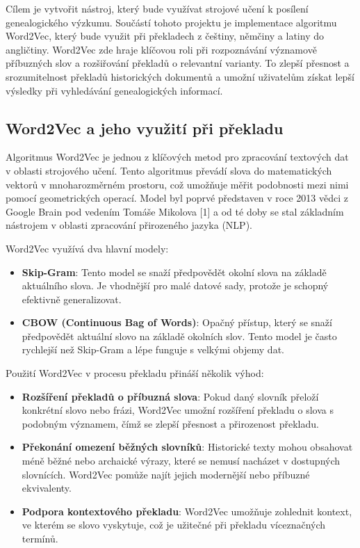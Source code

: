 \documentclass[czech, ba, kiv, he]{fasthesis}
\begin{document}
Cílem je vytvořit nástroj, který bude využívat strojové učení k posílení genealogického výzkumu. Součástí tohoto projektu je implementace algoritmu Word2Vec, který bude využit při překladech z češtiny, němčiny a latiny do angličtiny. Word2Vec zde hraje klíčovou roli při rozpoznávání významově příbuzných slov a rozšiřování překladů o relevantní varianty. To zlepší přesnost a srozumitelnost překladů historických dokumentů a umožní uživatelům získat lepší výsledky při vyhledávání genealogických informací.  

\subsection{Word2Vec a jeho využití při překladu}  

Algoritmus Word2Vec je jednou z klíčových metod pro zpracování textových dat v oblasti strojového učení. Tento algoritmus převádí slova do matematických vektorů v mnoharozměrném prostoru, což umožňuje měřit podobnosti mezi nimi pomocí geometrických operací. Model byl poprvé představen v roce 2013 vědci z Google Brain pod vedením Tomáše Mikolova [1] a od té doby se stal základním nástrojem v oblasti zpracování přirozeného jazyka (NLP).  

Word2Vec využívá dva hlavní modely:  

\begin{itemize}  
    \item \textbf{Skip-Gram}: Tento model se snaží předpovědět okolní slova na základě aktuálního slova. Je vhodnější pro malé datové sady, protože je schopný efektivně generalizovat.  
    \item \textbf{CBOW (Continuous Bag of Words)}: Opačný přístup, který se snaží předpovědět aktuální slovo na základě okolních slov. Tento model je často rychlejší než Skip-Gram a lépe funguje s velkými objemy dat.  
\end{itemize}  

Použití Word2Vec v procesu překladu přináší několik výhod:  

\begin{itemize}  
    \item \textbf{Rozšíření překladů o příbuzná slova}: Pokud daný slovník přeloží konkrétní slovo nebo frázi, Word2Vec umožní rozšíření překladu o slova s podobným významem, čímž se zlepší přesnost a přirozenost překladu.  
    \item \textbf{Překonání omezení běžných slovníků}: Historické texty mohou obsahovat méně běžné nebo archaické výrazy, které se nemusí nacházet v dostupných slovnících. Word2Vec pomůže najít jejich modernější nebo příbuzné ekvivalenty.  
    \item \textbf{Podpora kontextového překladu}: Word2Vec umožňuje zohlednit kontext, ve kterém se slovo vyskytuje, což je užitečné při překladu víceznačných termínů.  
\end{itemize}  
\end{document}
